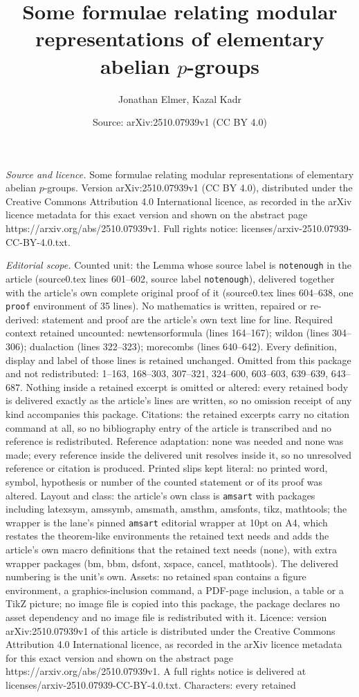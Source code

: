 \documentclass[10pt,a4paper]{amsart}
\title[Some formulae relating modular representations of elementary]{Some formulae relating modular representations of elementary abelian $p$-groups}
\author{Jonathan Elmer, Kazal Kadr}
\date{Source: arXiv:2510.07939v1 (CC BY 4.0)}
\begin{document}
\maketitle

\noindent\emph{Source and licence.} Some formulae relating modular representations of elementary abelian $p$-groups. Version arXiv:2510.07939v1 (CC BY 4.0), distributed under the Creative Commons Attribution 4.0 International licence, as recorded in the arXiv licence metadata for this exact version and shown on the abstract page https://arxiv.org/abs/2510.07939v1. Full rights notice: licenses/arxiv-2510.07939-CC-BY-4.0.txt.\par\smallskip

\noindent\textit{Editorial scope.} Counted unit: the Lemma whose source label is \texttt{notenough} in the article (source0.tex lines 601--602, source label \texttt{notenough}), delivered together with the article's own complete original proof of it (source0.tex lines 604--638, one \texttt{proof} environment of 35 lines). No mathematics is written, repaired or re-derived: statement and proof are the article's own text line for line. Required context retained uncounted: newtensorformula (lines 164--167); wildon (lines 304--306); dualaction (lines 322--323); morecombs (lines 640--642). Every definition, display and label of those lines is retained unchanged. Omitted from this package and not redistributed: 1--163, 168--303, 307--321, 324--600, 603--603, 639--639, 643--687. Nothing inside a retained excerpt is omitted or altered: every retained body is delivered exactly as the article's lines are written, so no omission receipt of any kind accompanies this package. Citations: the retained excerpts carry no citation command at all, so no bibliography entry of the article is transcribed and no reference is redistributed. Reference adaptation: none was needed and none was made; every reference inside the delivered unit resolves inside it, so no unresolved reference or citation is produced. Printed slips kept literal: no printed word, symbol, hypothesis or number of the counted statement or of its proof was altered. Layout and class: the article's own class is \texttt{amsart} with packages including latexsym, amssymb, amsmath, amsthm, amsfonts, tikz, mathtools; the wrapper is the lane's pinned \texttt{amsart} editorial wrapper at 10pt on A4, which restates the theorem-like environments the retained text needs and adds the article's own macro definitions that the retained text needs (none), with extra wrapper packages (bm, bbm, dsfont, xspace, cancel, mathtools). The delivered numbering is the unit's own. Assets: no retained span contains a figure environment, a graphics-inclusion command, a PDF-page inclusion, a table or a TikZ picture; no image file is copied into this package, the package declares no asset dependency and no image file is redistributed with it. Licence: version arXiv:2510.07939v1 of this article is distributed under the Creative Commons Attribution 4.0 International licence, as recorded in the arXiv licence metadata for this exact version and shown on the abstract page https://arxiv.org/abs/2510.07939v1. A full rights notice is delivered at licenses/arxiv-2510.07939-CC-BY-4.0.txt. Characters: every retained 
\end{document}
